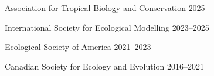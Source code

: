 

\begin{cvhonors}

  \mycvhonor
    {Association for Tropical Biology and Conservation} %
    {} %
    {2025} %

  \mycvhonor
    {International Society for Ecological Modelling} %
    {} %
    {2023--2025} %
    
  \mycvhonor
    {Ecological Society of America} %
    {} %
    {2021--2023} %

  \mycvhonor
    {Canadian Society for Ecology and Evolution} %
    {} %
    {2016--2021} %

\end{cvhonors}
